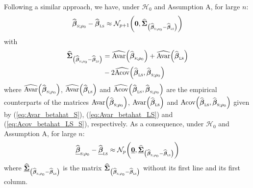 Following a similar approach, we have, under $\mathcal{H}_{0}$ and Assumption
A, for large $n$:
\[
\sthat{\boldsymbol\beta}_{\stsc{S};\rho_{0}}-\sthat{\boldsymbol{\beta
}}_{\stsc{LS}}\approx\mathcal{N}_{p+1}\left(  \mathbf{0},\widehat
{\boldsymbol{\Sigma}}_{\left(  \sthat{\boldsymbol\beta}_{\stsc{S}%
;\rho_{0}}-\sthat{\boldsymbol\beta}_{\stsc{LS}}\right)  }\right)
\]
with
\begin{align}
\sthat{\boldsymbol{\Sigma}}_{\left(  \sthat{\boldsymbol\beta%
}_{\stsc{S};\rho_{0}}-\sthat{\boldsymbol\beta}_{\stsc{LS}}\right)  }
&  =\sthat{\mathrm{Avar}}\left(  \sthat{\boldsymbol\beta}_{\stsc{S}%
;\rho_{0}}\right)  +\sthat{\mathrm{Avar}}\left(  \sthat{\boldsymbol{\beta
}}_{\stsc{LS}}\right) \label{eq:Hausman_sigmahat_S-LS}\\
&  -2\sthat{\mathrm{Acov}}\left(  \sthat{\boldsymbol\beta}_{\stsc{LS}%
},\sthat{\boldsymbol\beta}_{\stsc{S};\rho_{0}}\right) \nonumber
\end{align}
where $\sthat{\mathrm{Avar}}\left(  \sthat{\boldsymbol\beta}%
_{\stsc{S};\rho_{0}}\right)  $, $\sthat{\mathrm{Avar}}\left(
\sthat{\boldsymbol\beta}_{\stsc{LS}}\right)  $ and $\widehat
{\mathrm{Acov}}\left(  \sthat{\boldsymbol\beta}_{\stsc{LS}}%
,\sthat{\boldsymbol\beta}_{\stsc{S};\rho_{0}}\right)  $ are the
empirical counterparts of the matrices $\mathrm{Avar}\left(  \widehat
{\boldsymbol\beta}_{\stsc{S};\rho_{0}}\right)  $, $\mathrm{Avar}\left(
\sthat{\boldsymbol\beta}_{\stsc{LS}}\right)  $ and $\mathrm{Acov}\left(
\sthat{\boldsymbol\beta}_{\stsc{LS}},\sthat{\boldsymbol\beta%
}_{\stsc{S};\rho_{0}}\right)  $ given by (\ref{eq:Avar_betahat_S}),
(\ref{eq:Avar_betahat_LS}) and (\ref{eq:Acov_betahat_LS_S}), respectively. As
a consequence, under $\mathcal{H}_{0}$ and Assumption A, for large $n$:
\begin{equation}
\sthat{\underline{\boldsymbol\beta}}_{\stsc{S};\rho_{0}}-\underline
{\sthat{\boldsymbol\beta}}_{\stsc{LS}}\approx\mathcal{N}_{p}\left(
\underline{\mathbf{0}},\sthat{\underline{\boldsymbol{\Sigma}}}_{\left(
\sthat{\boldsymbol\beta}_{\stsc{S};\rho_{0}}-\sthat{\boldsymbol{\beta
}}_{\stsc{LS}}\right)  }\right)  \label{eq:Hausman_normality_S-LS}%
\end{equation}
where $\sthat{\underline{\boldsymbol{\Sigma}}}_{\left(  \widehat
{\boldsymbol\beta}_{\stsc{S};\rho_{0}}-\sthat{\boldsymbol\beta%
}_{\stsc{LS}}\right)  }$ is the matrix $\sthat{\boldsymbol{\Sigma}%
}_{\left(  \sthat{\boldsymbol\beta}_{\stsc{S};\rho_{0}}-\widehat
{\boldsymbol\beta}_{\stsc{LS}}\right)  }$ without its first line and its
first column.

